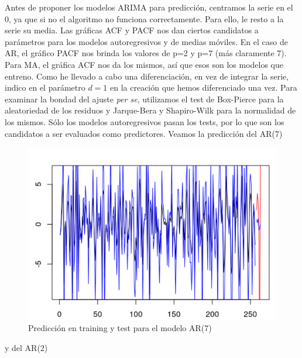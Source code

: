 Antes de proponer los modelos ARIMA para predicción, centramos la serie en el 0, ya que si no el algoritmo no funciona correctamente. Para ello, le resto a la serie su media. Las gráficas ACF y PACF nos dan ciertos candidatos a parámetros para los modelos autoregresivos y de medias móviles. En el caso de AR, el gráfico PACF nos brinda los valores de p=2 y p=7 (más claramente 7). Para MA, el gráfica ACF nos da los mismos, así que esos son los modelos que entreno. Como he llevado a cabo una diferenciación, en vez de integrar la serie, indico en el parámetro $d=1$ en la creación que hemos diferenciado una vez. Para examinar la bondad del ajuste \textit{per se}, utilizamos el test de Box-Pierce para la aleatoriedad de los residuos y Jarque-Bera y Shapiro-Wilk para la normalidad de los mismos. Sólo los modelos autoregresivos pasan los tests, por lo que son los candidatos a ser evaluados como predictores. Veamos la predicción del AR(7)

\begin{figure}[H] %
	\centering
	\includegraphics[scale=0.25]{ar710-diario.png}  %
	\caption{Predicción en training y test para el modelo AR(7)} 
	\label{fig:ar710-d}
\end{figure}

y del AR(2)

